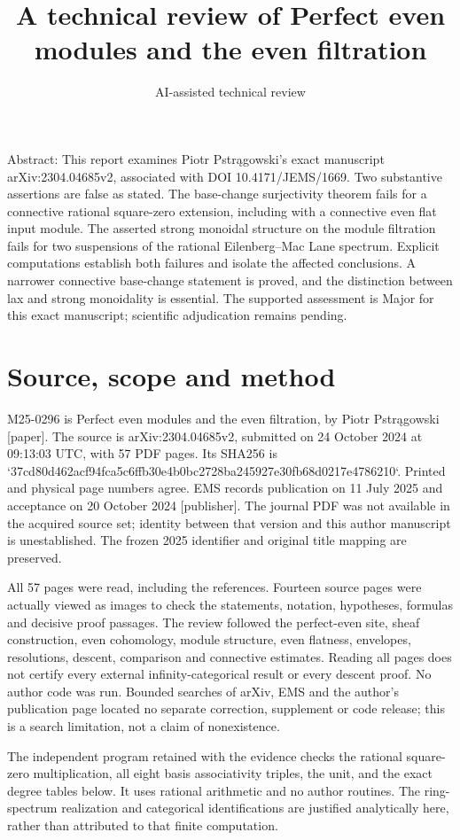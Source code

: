 \documentclass[10pt]{article}
\title{A technical review of
Perfect even modules and the even filtration}
\author{AI-assisted technical review}
\date{}
\begin{document}
\maketitle
Abstract: This report examines Piotr Pstrągowski’s exact manuscript arXiv:2304.04685v2, associated with DOI 10.4171/JEMS/1669. Two substantive assertions are false as stated. The base-change surjectivity theorem fails for a connective rational square-zero extension, including with a connective even flat input module. The asserted strong monoidal structure on the module filtration fails for two suspensions of the rational Eilenberg–Mac Lane spectrum. Explicit computations establish both failures and isolate the affected conclusions. A narrower connective base-change statement is proved, and the distinction between lax and strong monoidality is essential. The supported assessment is Major for this exact manuscript; scientific adjudication remains pending.\par
\section*{Source, scope and method}
M25-0296 is Perfect even modules and the even filtration, by Piotr Pstrągowski [paper]. The source is arXiv:2304.04685v2, submitted on 24 October 2024 at 09:13:03 UTC, with 57 PDF pages. Its SHA256 is `37cd80d462acf94fca5c6ffb30e4b0bc2728ba245927e30fb68d0217e4786210`. Printed and physical page numbers agree. EMS records publication on 11 July 2025 and acceptance on 20 October 2024 [publisher]. The journal PDF was not available in the acquired source set; identity between that version and this author manuscript is unestablished. The frozen 2025 identifier and original title mapping are preserved.\par
All 57 pages were read, including the references. Fourteen source pages were actually viewed as images to check the statements, notation, hypotheses, formulas and decisive proof passages. The review followed the perfect-even site, sheaf construction, even cohomology, module structure, even flatness, envelopes, resolutions, descent, comparison and connective estimates. Reading all pages does not certify every external infinity-categorical result or every descent proof. No author code was run. Bounded searches of arXiv, EMS and the author’s publication page located no separate correction, supplement or code release; this is a search limitation, not a claim of nonexistence.\par
The independent program retained with the evidence checks the rational square-zero multiplication, all eight basis associativity triples, the unit, and the exact degree tables below. It uses rational arithmetic and no author routines. The ring-spectrum realization and categorical identifications are justified analytically here, rather than attributed to that finite computation.\par
\end{document}
